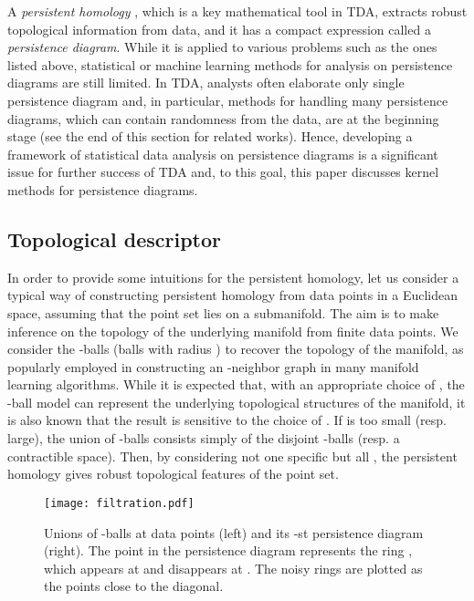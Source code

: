 \documentclass{article}
\begin{document}
A {\em persistent homology} \cite{ELZ02}, which is a key mathematical tool in TDA, extracts robust topological information from data, and it has a compact expression called a {\em persistence diagram}.
While it is applied to various problems such as the ones listed above, statistical or machine learning methods for analysis on persistence diagrams are still limited.
In TDA, analysts often elaborate only single persistence diagram and, in particular, methods for handling many persistence diagrams, which can contain randomness from the data, are at the beginning stage (see the end of this section for related works).
Hence, developing a framework of statistical data analysis on persistence diagrams is a significant issue for further success of TDA and, to this goal, this paper discusses kernel methods for persistence diagrams.

\subsection{Topological descriptor}
\label{subsec:persistent_homology}

In order to provide some intuitions for the persistent homology, let us consider a typical way of constructing persistent homology from data points in a Euclidean space, assuming that the point set lies on a submanifold.
The aim is to make inference on the topology of the underlying manifold from finite data points.
We consider the -balls (balls with radius ) to recover the topology of the manifold, as popularly employed in constructing an -neighbor graph in many manifold learning algorithms.
While it is expected that, with an appropriate choice of , the -ball model can represent the underlying topological structures of the manifold, it is also known that the result is sensitive to the choice of .
If  is too small (resp. large), the union of -balls consists simply of the disjoint -balls (resp. a contractible space).
Then, by considering not one specific  but all , the persistent homology gives robust topological features of the point set.
\begin{figure}[htbp]
\begin{center}
\texttt{[image: filtration.pdf]}
\caption{Unions of -balls at data points (left) and its -st persistence diagram (right). The point  in the persistence diagram represents the ring , which appears at  and disappears at . The noisy rings are plotted as the points close to the diagonal.}
\label{fig:filtration}
\end{center}
\end{figure}
\end{document}

